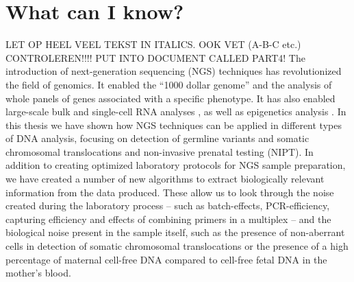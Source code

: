 \chapter[What can I know?]{What can I know? }
\label{chap:epistemology}

{ \Large {} }


\newpage

\noindent LET OP HEEL VEEL TEKST IN ITALICS. OOK VET (A-B-C etc.) CONTROLEREN!!!! PUT INTO DOCUMENT CALLED PART4! The introduction of next-generation sequencing (NGS) techniques has revolutionized the field of genomics. 
It enabled the “1000 dollar genome” \cite{Rincon_2014} and the analysis of whole panels of genes associated with a specific phenotype. 
It has also enabled large-scale bulk and single-cell RNA analyses \cite{van_der_Wijst_2018}, as well as epigenetics analysis \cite{Jiang_2018,Le_Dily_2017,Andrews_2018}. 
In this thesis we have shown how NGS techniques can be applied in different types of DNA analysis, focusing on detection of germline variants and somatic chromosomal translocations and non-invasive prenatal testing (NIPT). 
In addition to creating optimized laboratory protocols for NGS sample preparation, we have created a number of new algorithms to extract biologically relevant information from the data produced. 
These allow us to look through the noise created during the laboratory process – such as batch-effects, PCR-efficiency, capturing efficiency and effects of combining primers in a multiplex – and the biological noise present in the sample itself, such as the presence of non-aberrant cells in detection of somatic chromosomal translocations or the presence of a high percentage of maternal cell-free DNA compared to cell-free fetal DNA in the mother’s blood. 

